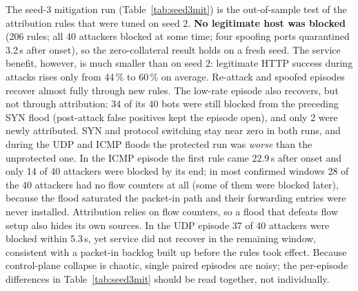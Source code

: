 \documentclass[conference]{IEEEtran}
\begin{document}
The seed-3 mitigation run (Table~\ref{tab:seed3mit}) is the out-of-sample test of the attribution rules that were tuned on seed 2. \textbf{No legitimate host was blocked} (206 rules; all 40 attackers blocked at some time; four spoofing ports quarantined 3.2\,s after onset), so the zero-collateral result holds on a fresh seed. The service benefit, however, is much smaller than on seed 2: legitimate HTTP success during attacks rises only from 44\,\% to 60\,\% on average. Re-attack and spoofed episodes recover almost fully through new rules. The low-rate episode also recovers, but not through attribution: 34 of its 40 bots were still blocked from the preceding SYN flood (post-attack false positives kept the episode open), and only 2 were newly attributed. SYN and protocol switching stay near zero in both runs, and during the UDP and ICMP floods the protected run was \emph{worse} than the unprotected one. In the ICMP episode the first rule came 22.9\,s after onset and only 14 of 40 attackers were blocked by its end; in most confirmed windows 28 of the 40 attackers had no flow counters at all (some of them were blocked later), because the flood saturated the packet-in path and their forwarding entries were never installed. Attribution relies on flow counters, so a flood that defeats flow setup also hides its own sources. In the UDP episode 37 of 40 attackers were blocked within 5.3\,s, yet service did not recover in the remaining window, consistent with a packet-in backlog built up before the rules took effect. Because control-plane collapse is chaotic, single paired episodes are noisy; the per-episode differences in Table~\ref{tab:seed3mit} should be read together, not individually.
\end{document}
